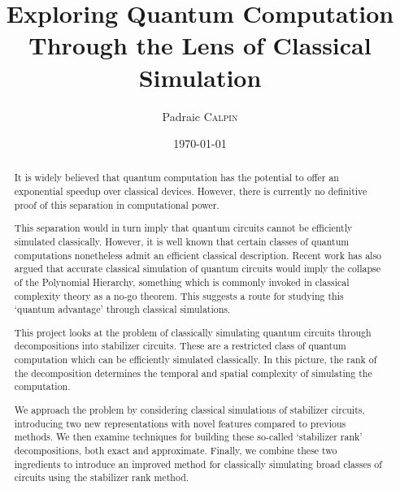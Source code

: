 

\title{Exploring Quantum Computation Through the Lens of Classical Simulation}
\author{Padraic \textsc{Calpin}}
\date{\today}

\maketitle
\makedeclaration

\begin{abstract} %
It is widely believed that quantum computation has the potential to offer an exponential speedup over classical devices. However, there is currently no definitive proof of this separation in computational power.\par
This separation would in turn imply that quantum circuits cannot be efficiently simulated classically. However, it is well known that certain classes of quantum computations nonetheless admit an efficient classical description. Recent work has also argued that accurate classical simulation of quantum circuits would imply the collapse of the Polynomial Hierarchy, something which is commonly invoked in classical complexity theory as a no-go theorem. This suggests a route for studying this ‘quantum advantage’ through classical simulations.\par
This project looks at the problem of classically simulating quantum circuits through decompositions into stabilizer circuits. These are a restricted class of quantum computation which can be efficiently simulated classically. In this picture, the rank of the decomposition determines the temporal and spatial complexity of simulating the computation.\par
We approach the problem by considering classical simulations of stabilizer circuits, introducing two new representations with novel features compared to previous methods. We then examine techniques for building these so-called ‘stabilizer rank’ decompositions, both exact and approximate.  Finally, we combine these two ingredients to introduce an improved method for classically simulating broad classes of circuits using the stabilizer rank method.
\end{abstract}

